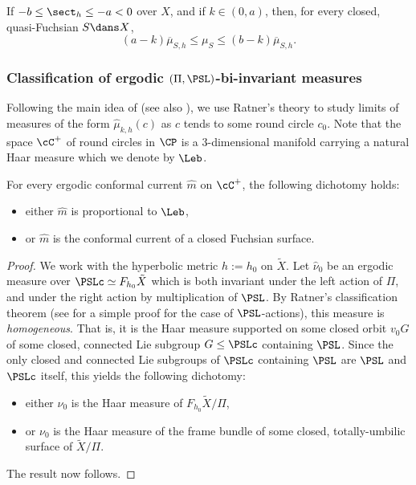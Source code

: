 \begin{lemma}\label{lem_comparison_area_laminar}
If $-b\leq \sect_h\leq -a<0$ over $X$, and if $k\in(0,a)$, then, for every closed, quasi-Fuchsian \ksurface $S\dans X$,
\begin{equation*}
(a-k)\overline{\mu}_{S,h}\leq\mu_S\leq(b-k)\overline{\mu}_{S,h}.
\end{equation*}
\end{lemma}

\subsubsection{Classification of ergodic $(\Pi,\PSL)$-bi-invariant measures}

Following the main idea of \cite{CMN} (see also \cite{LabourieBourbaki}), we use Ratner's theory to study limits of measures of the form $\hat\mu_{k,h}(c)$ as $c$ tends to some round circle $c_0$. Note that the space $\cC^+$ of round circles in $\CP$ is a $3$\nobreakdash-dimensional manifold carrying a natural Haar measure which we denote by $\Leb$.

\begin{theorem}
\label{thm.Ratner} For every ergodic conformal current $\hat m$ on $\cC^+$, the following dichotomy holds:
\begin{itemize}
\item either $\hat m$ is proportional to $\Leb$,
\item or $\hat m$ is the conformal current of a closed Fuchsian surface.
\end{itemize}
\end{theorem}

\begin{proof}
We work with the hyperbolic metric $h:=h_0$ on $\tilde{X}$. Let $\hat\nu_0$ be an ergodic measure over $\PSLc\simeq F_{h_0}\tilde{X}$ which is both invariant under the left action of $\Pi$, and under the right action by multiplication of $\PSL$. By Ratner's classification theorem \cite{Ratner_Duke} (see \cite{Einsiedler} for a simple proof for the case of $\PSL$-actions), this measure is \emph{homogeneous}. That is, it is the Haar measure supported on some closed orbit $v_0G$ of some closed, connected Lie subgroup $G\leq\PSLc$ containing $\PSL$. Since the only closed and connected Lie subgroups of $\PSLc$ containing $\PSL$ are $\PSL$ and $\PSLc$ itself, this yields the following dichotomy:
\begin{itemize}
\item either $\nu_0$ is the Haar measure of $F_{h_0}\tilde X/\Pi$,
\item or $\nu_0$ is the Haar measure of the frame bundle of some closed, totally-umbilic surface of $\tilde X/\Pi$.
\end{itemize}
The result now follows.
\end{proof}

